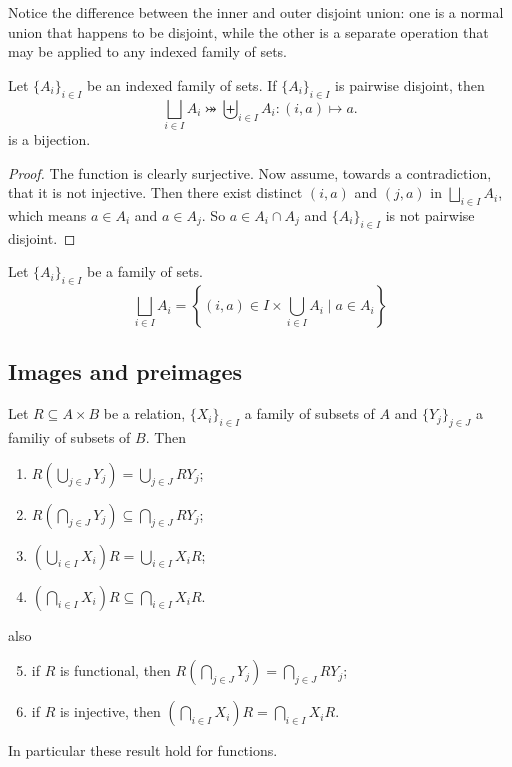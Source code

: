Notice the difference between the inner and outer disjoint union: one is a normal union that happens to be disjoint, while the other is a separate operation that may be applied to any indexed family of sets.

\begin{lemma}
Let $\{A_i\}_{i\in I}$ be an indexed family of sets. If $\{A_i\}_{i\in I}$ is pairwise disjoint, then
\[ \bigsqcup_{i\in I}A_i \twoheadrightarrowtail \biguplus_{i\in I}A_i: (i, a) \mapsto a. \]
is a bijection.
\end{lemma}
\begin{proof}
The function is clearly surjective. Now assume, towards a contradiction, that it is not injective. Then there exist distinct $(i,a)$ and $(j,a)$ in $\bigsqcup_{i\in I}A_i$, which means $a\in A_i$ and $a\in A_j$. So $a\in A_i\cap A_j$ and $\{A_i\}_{i\in I}$ is not pairwise disjoint.
\end{proof}

\begin{lemma}
Let $\{A_i\}_{i\in I}$ be a family of sets.
\[ \bigsqcup_{i\in I}A_i = \left\{ (i,a)\in I\times \bigcup_{i\in I}A_i \;|\; a\in A_i \right\} \]
\end{lemma}

\subsection{Images and preimages}
\begin{lemma}
Let $R \subseteq A\times B$ be a relation, $\{X_i\}_{i\in I}$ a family of subsets of $A$ and $\{Y_j\}_{j\in J}$ a familiy of subsets of $B$. Then
\begin{enumerate}
\item $R\left(\bigcup_{j\in J} Y_j\right) = \bigcup_{j\in J} RY_j$;
\item $R\left(\bigcap_{j\in J} Y_j\right) \subseteq \bigcap_{j\in J} RY_j$;
\item $\left(\bigcup_{i\in I} X_i\right)R = \bigcup_{i\in I} X_iR$;
\item $\left(\bigcap_{i\in I} X_i\right)R \subseteq \bigcap_{i\in I} X_iR$.
\end{enumerate}
also
\begin{enumerate} \setcounter{enumi}{4}
\item if $R$ is functional, then $R\left(\bigcap_{j\in J} Y_j\right) = \bigcap_{j\in J} RY_j$;
\item if $R$ is injective, then $\left(\bigcap_{i\in I} X_i\right)R = \bigcap_{i\in I} X_iR$.
\end{enumerate}
\end{lemma}
In particular these result hold for functions.
